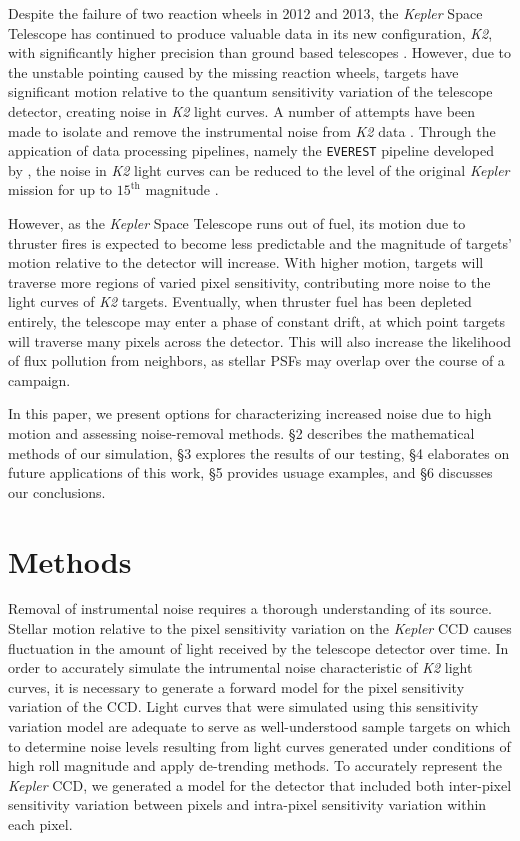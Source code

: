 \documentclass[12pt,preprint]{aastex}
\begin{document}
Despite the failure of two reaction wheels in 2012 and 2013, the \textit{Kepler} Space Telescope has continued to produce valuable data in its new configuration, \textit{K2}, with significantly higher precision than ground based telescopes \citep{2014PASP..126..398H}. However, due to the unstable pointing caused by the missing reaction wheels, targets have significant motion relative to the quantum sensitivity variation of the telescope detector, creating noise in \textit{K2} light curves. A number of attempts have been made to isolate and remove the instrumental noise from \textit{K2} data \citep{2015A&A...579A..19A, 0004-637X-806-1-30, 2015MNRAS.454.4159H, 2015MNRAS.447.2880A, 2016MNRAS.459.2408A}. Through the appication of data processing pipelines, namely the \texttt{EVEREST} pipeline developed by \cite{2016AJ....152..100L}, the noise in \textit{K2} light curves can be reduced to the level of the original \textit{Kepler} mission for up to $15^{\text{th}}$ magnitude \citep{2017arXiv170205488L}.

However, as the \textit{Kepler} Space Telescope runs out of fuel, its motion due to thruster fires is expected to become less predictable and the magnitude of targets' motion relative to the detector will increase. With higher motion, targets will traverse more regions of varied pixel sensitivity, contributing more noise to the light curves of \textit{K2} targets. Eventually, when thruster fuel has been depleted entirely, the telescope may enter a phase of constant drift, at which point targets will traverse many pixels across the detector. This will also increase the likelihood of flux pollution from neighbors, as stellar PSFs may overlap over the course of a campaign.

In this paper, we present options for characterizing increased noise due to high motion and assessing noise-removal methods. \S 2 describes the mathematical methods of our simulation, \S 3 explores the results of our testing, \S 4 elaborates on future applications of this work, \S 5 provides usuage examples, and \S 6 discusses our conclusions.

\section{Methods}

Removal of instrumental noise requires a thorough understanding of its source. Stellar motion relative to the pixel sensitivity variation on the \textit{Kepler} CCD causes fluctuation in the amount of light received by the telescope detector over time. In order to accurately simulate the intrumental noise characteristic of \textit{K2} light curves, it is necessary to generate a forward model for the pixel sensitivity variation of the CCD. Light curves that were simulated using this sensitivity variation model are adequate to serve as well-understood sample targets on which to determine noise levels resulting from light curves generated under conditions of high roll magnitude and apply de-trending methods. To accurately represent the \textit{Kepler} CCD, we generated a model for the detector that included both inter-pixel sensitivity variation between pixels and intra-pixel sensitivity variation within each pixel.
\end{document}
